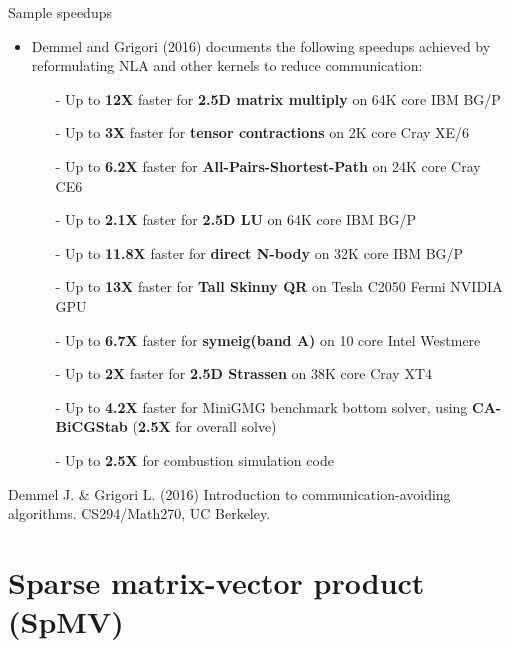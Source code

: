 \documentclass[t,usepdftitle=false]{beamer}
\begin{document}
\begin{frame}{Sample speedups}
\begin{itemize}
\item Demmel and Grigori (2016) documents the following speedups achieved by reformulating NLA and other kernels to reduce communication:\vspace{.1cm}
\begin{itemize}\normalsize
\item[-] Up to \textbf{12X} faster for \textbf{2.5D matrix multiply} on 64K core IBM BG/P\vspace{.1cm}
\item[-] Up to \textbf{3X} faster for \textbf{tensor contractions} on 2K core Cray XE/6\vspace{.1cm}
\item[-] Up to \textbf{6.2X} faster for \textbf{All-Pairs-Shortest-Path} on 24K core Cray CE6\vspace{.1cm}
\item[-] Up to \textbf{2.1X} faster for \textbf{2.5D LU} on 64K core IBM BG/P\vspace{.1cm}
\item[-] Up to \textbf{11.8X} faster for \textbf{direct N-body} on 32K core IBM BG/P\vspace{.1cm}
\item[-] Up to \textbf{13X} faster for \textbf{Tall Skinny QR} on Tesla C2050 Fermi NVIDIA GPU\vspace{.1cm}
\item[-] Up to \textbf{6.7X} faster for \textbf{symeig(band A)} on 10 core Intel Westmere\vspace{.1cm}
\item[-] Up to \textbf{2X} faster for \textbf{2.5D Strassen} on 38K core Cray XT4\vspace{.1cm}
\item[-] Up to \textbf{4.2X} faster for MiniGMG benchmark bottom solver, using \textbf{CA-BiCGStab} (\textbf{2.5X} for overall solve)\vspace{.1cm}
\item[-] Up to \textbf{2.5X} for combustion simulation code
\end{itemize}
\end{itemize}
\smallskip
\tiny{Demmel J. \& Grigori L. (2016) Introduction to communication-avoiding algorithms. CS294/Math270, UC Berkeley.}
\end{frame}

\section{Sparse matrix-vector product (SpMV)}
\end{document}
